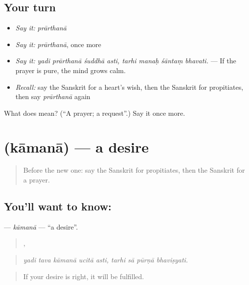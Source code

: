 \subsection*{Your turn}
\begin{itemize}
\raggedright
  \item \emph{Say it:} \emph{prārthanā}
  \item \emph{Say it:} \emph{prārthanā}, once more
  \item \emph{Say it:} \emph{yadi prārthanā śuddhā asti, tarhi manaḥ śāntaṃ bhavati.} — If the prayer is pure, the mind grows calm.
  \item \emph{Recall:} say the Sanskrit for a heart's wish, then the Sanskrit for propitiates, then say \emph{prārthanā} again
\end{itemize}

\begin{tcolorbox}[breakable,colback=teal!4,colframe=teal!35!black,title={Before you move on}]
What does  mean? (\textquotedblleft{}A prayer; a request\textquotedblright{}.) Say it once more.
\end{tcolorbox}
\section[\texorpdfstring{\sk{कामना} (kāmanā)}{कामना (kāmanā)}]{ (kāmanā) — a desire}

\label{lesson:SA-C531-kamana}



\begin{quote}
Before the new one: say the Sanskrit for propitiates, then the Sanskrit for a prayer.
\end{quote}

\subsection*{You'll want to know: }
\textbf{} — \emph{kāmanā} — \textquotedblleft{}a desire\textquotedblright{}.

\begin{quote}
    ,    
\end{quote}

\begin{quote}
\emph{yadi tava kāmanā ucitā asti, tarhi sā pūrṇā bhaviṣyati.}
\end{quote}

\begin{quote}
If your desire is right, it will be fulfilled.
\end{quote}

